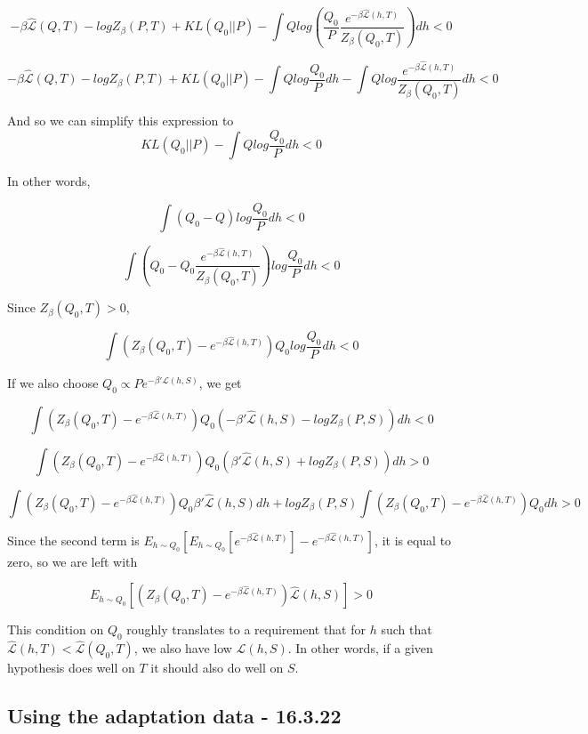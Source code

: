 \documentclass[letterpaper]{article}
\theoremstyle{definition}
\begin{document}
$$ -\beta \hat{\mathcal{L}}(Q,T)-logZ_{\beta}(P,T)+KL(Q_0||P)-\int Qlog\left (\frac{Q_0}{P}\frac{e^{-\beta \hat{\mathcal{L}}(h,T)}}{Z_\beta(Q_0,T)}\right )dh<0$$

$$ -\beta \hat{\mathcal{L}}(Q,T)-logZ_{\beta}(P,T)+KL(Q_0||P)-\int Qlog\frac{Q_0}{P}dh-\int Qlog\frac{e^{-\beta \hat{\mathcal{L}}(h,T)}}{Z_\beta(Q_0,T)}dh<0$$

And so we can simplify this expression to
$$ KL(Q_0||P)-\int Qlog\frac{Q_0}{P}dh<0$$

In other words, 

$$\int (Q_0-Q)log\frac{Q_0}{P}dh<0$$

$$\int \left (Q_0-Q_0\frac{e^{-\beta\hat{\mathcal{L}}(h,T)}}{Z_{\beta}(Q_0,T)}\right )log\frac{Q_0}{P}dh<0$$

Since $Z_{\beta}(Q_0,T)>0$,

$$\int \left (Z_{\beta}(Q_0,T)-e^{-\beta\hat{\mathcal{L}}(h,T)}\right )Q_0log\frac{Q_0}{P}dh<0$$

If we also choose $Q_0\propto P e^{-\beta' \hat{\mathcal{L}}(h,S)}$, we get

$$\int \left (Z_{\beta}(Q_0,T)-e^{-\beta\hat{\mathcal{L}}(h,T)}\right )Q_0\left (-\beta'\hat{\mathcal{L}}(h,S)-logZ_{\beta}(P,S)\right )dh<0$$

$$\int \left (Z_{\beta}(Q_0,T)-e^{-\beta\hat{\mathcal{L}}(h,T)}\right )Q_0\left (\beta'\hat{\mathcal{L}}(h,S)+logZ_{\beta}(P,S)\right )dh>0$$

$$\int \left (Z_{\beta}(Q_0,T)-e^{-\beta\hat{\mathcal{L}}(h,T)}\right )Q_0 \beta'\hat{\mathcal{L}}(h,S)dh+logZ_{\beta}(P,S)\int \left (Z_{\beta}(Q_0,T)-e^{-\beta\hat{\mathcal{L}}(h,T)}\right )Q_0dh>0$$

Since the second term is $E_{h\sim Q_0}[E_{h\sim Q_0}[e^{-\beta\hat{\mathcal{L}}(h,T)}]-e^{-\beta\hat{\mathcal{L}}(h,T)}]$, it is equal to zero, so we are left with

$$E_{h\sim Q_0}\left [\left (Z_{\beta}(Q_0,T)-e^{-\beta\hat{\mathcal{L}}(h,T)}\right ) \hat{\mathcal{L}}(h,S)\right ]>0$$

This condition on $Q_0$ roughly translates to a requirement that for $h$ such that $\hat{\mathcal{L}}(h,T)<\hat{\mathcal{L}}(Q_0,T)$, we also have low $\hat{\mathcal{L}}(h,S)$.
In other words, if a given hypothesis does well on $T$ it should also do well on $S$.

\subsection{Using the adaptation data - 16.3.22}
\end{document}
